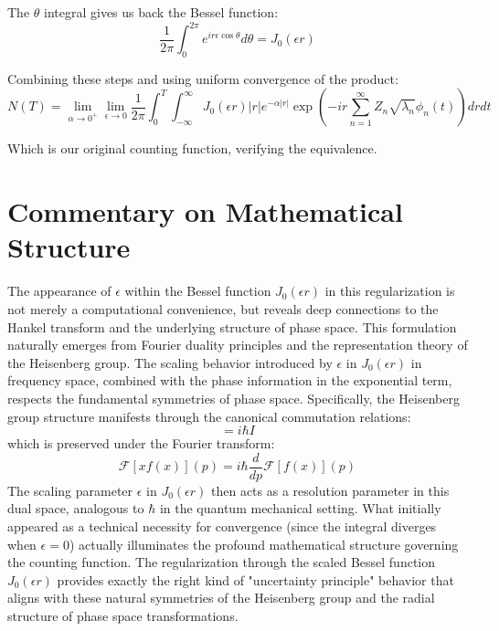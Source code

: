 \documentclass{article}
\begin{document}
The $\theta$ integral gives us back the Bessel function:
\begin{equation}
    \frac{1}{2\pi} \int_0^{2\pi} e^{ir\epsilon\cos\theta} d\theta = J_0(\epsilon r)
\end{equation}

Combining these steps and using uniform convergence of the product:
\begin{equation}
    N(T) = \lim_{\alpha \to 0^+} \lim_{\epsilon \to 0} \frac{1}{2\pi} \int_0^T \int_{-\infty}^{\infty} J_0(\epsilon r)|r|e^{-\alpha|r|} \exp\left(-ir\sum_{n=1}^{\infty} Z_n \sqrt{\lambda_n} \phi_n(t)\right) dr dt
\end{equation}

Which is our original counting function, verifying the equivalence.


\section*{Commentary on Mathematical Structure}
The appearance of $\epsilon$ within the Bessel function $J_0(\epsilon r)$ in this regularization is not merely a computational convenience, but reveals deep connections to the Hankel transform and the underlying structure of phase space. This formulation naturally emerges from Fourier duality principles and the representation theory of the Heisenberg group. The scaling behavior introduced by $\epsilon$ in $J_0(\epsilon r)$ in frequency space, combined with the phase information in the exponential term, respects the fundamental symmetries of phase space. Specifically, the Heisenberg group structure manifests through the canonical commutation relations:
\begin{equation}
    [X,P] = i\hbar I
\end{equation}
which is preserved under the Fourier transform:
\begin{equation}
    \mathcal{F}[xf(x)](p) = i\hbar\frac{d}{dp}\mathcal{F}[f(x)](p)
\end{equation}
The scaling parameter $\epsilon$ in $J_0(\epsilon r)$ then acts as a resolution parameter in this dual space, analogous to $\hbar$ in the quantum mechanical setting. What initially appeared as a technical necessity for convergence (since the integral diverges when $\epsilon = 0$) actually illuminates the profound mathematical structure governing the counting function. The regularization through the scaled Bessel function $J_0(\epsilon r)$ provides exactly the right kind of "uncertainty principle" behavior that aligns with these natural symmetries of the Heisenberg group and the radial structure of phase space transformations.
\end{document}
